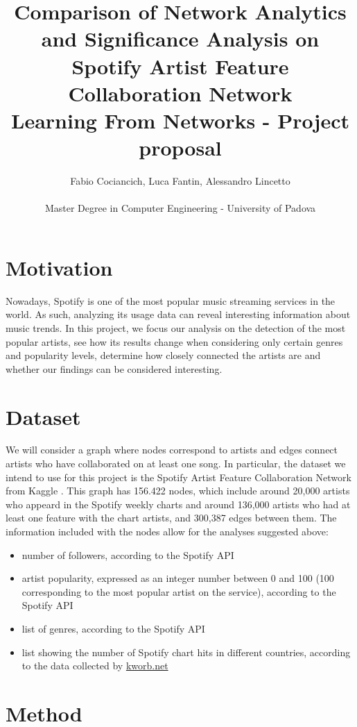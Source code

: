 \documentclass[a4paper, 12pt, conference]{ieeeconf}      %
\title{Comparison of Network Analytics and Significance Analysis on Spotify Artist Feature Collaboration Network\\
\large Learning From Networks - Project proposal \\}
\author{Fabio Cociancich, Luca Fantin, Alessandro Lincetto %
\\\\ Master Degree in Computer Engineering - University of Padova \\
}
\begin{document}
\maketitle
\thispagestyle{plain}
\pagestyle{plain}

\section{Motivation} 

Nowadays, Spotify is one of the most popular music streaming services in the world. As such, analyzing its usage data can reveal interesting information about music trends. In this project, we focus our analysis on the detection of the most popular artists, see how its results change when considering only certain genres and popularity levels, determine how closely connected the artists are and whether our findings can be considered interesting.

\section{Dataset}

We will consider a graph where nodes correspond to artists and edges connect artists who have collaborated on at least one song. In particular, the dataset we intend to use for this project is the Spotify Artist Feature Collaboration Network from Kaggle \cite{dataset}. This graph has 156.422 nodes, which include around 20,000 artists who appeard in the Spotify weekly charts and around 136,000 artists who had at least one feature with the chart artists, and 300,387 edges between them. The information included with the nodes allow for the analyses suggested above:
\begin{itemize}
    \item number of followers, according to the Spotify API
    \item artist popularity, expressed as an integer number between 0 and 100 (100 corresponding to the most popular artist on the service), according to the Spotify API
    \item list of genres, according to the Spotify API
    \item list showing the number of Spotify chart hits in different countries, according to the data collected by \href{kworb.net}{kworb.net}
\end{itemize}

\section{Method}
\end{document}
